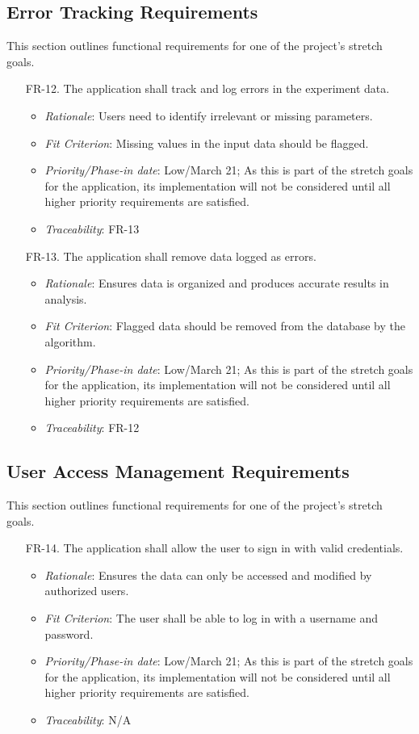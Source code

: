\documentclass[12pt]{article}
\begin{document}
\subsection{Error Tracking Requirements}
This section outlines functional requirements for one of the project's stretch goals.
\begin{enumerate}
  \item[FR-12.] The application shall track and log errors in the experiment data.
  \begin{itemize}
    \item \textit{Rationale}: Users need to identify irrelevant or missing parameters.
    \item \textit{Fit Criterion}: Missing values in the input data should be flagged.
    \item \textit{Priority/Phase-in date}: Low/March 21; As this is part of the stretch goals for the application, its implementation will not be considered until all higher priority requirements are satisfied.
    \item \textit{Traceability}: FR-13
  \end{itemize}
  \item[FR-13.] The application shall remove data logged as errors.
  \begin{itemize}
    \item \textit{Rationale}: Ensures data is organized and produces accurate results in analysis.
    \item \textit{Fit Criterion}: Flagged data should be removed from the database by the algorithm.
    \item \textit{Priority/Phase-in date}: Low/March 21; As this is part of the stretch goals for the application, its implementation will not be considered until all higher priority requirements are satisfied.
    \item \textit{Traceability}: FR-12
  \end{itemize}
\end{enumerate}

\subsection{User Access Management Requirements}
This section outlines functional requirements for one of the project's stretch goals.
\begin{enumerate}
  \item[FR-14.] The application shall allow the user to sign in with valid credentials.
  \begin{itemize}
    \item \textit{Rationale}: Ensures the data can only be accessed and modified by authorized users.
    \item \textit{Fit Criterion}: The user shall be able to log in with a username and password.
    \item \textit{Priority/Phase-in date}: Low/March 21; As this is part of the stretch goals for the application, its implementation will not be considered until all higher priority requirements are satisfied.
    \item \textit{Traceability}: N/A
  \end{itemize}
\end{enumerate}
\end{document}
